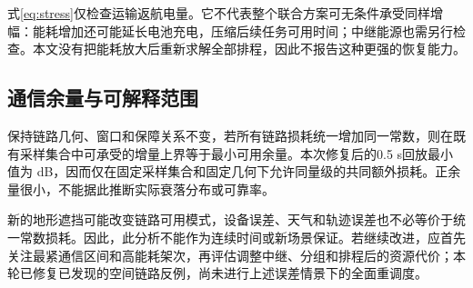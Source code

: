 式\eqref{eq:stress}仅检查运输返航电量。它不代表整个联合方案可无条件承受同样增幅：能耗增加还可能延长电池充电，压缩后续任务可用时间；中继能源也需另行检查。本文没有把能耗放大后重新求解全部排程，因此不报告这种更强的恢复能力。

\subsection{通信余量与可解释范围}
保持链路几何、窗口和保障关系不变，若所有链路损耗统一增加同一常数，则在既有采样集合中可承受的增量上界等于最小可用余量。本次修复后的0.5 s回放最小值为 \MarginHalf{} dB，因而仅在固定采样集合和固定几何下允许同量级的共同额外损耗。正余量很小，不能据此推断实际衰落分布或可靠率。

新的地形遮挡可能改变链路可用模式，设备误差、天气和轨迹误差也不必等价于统一常数损耗。因此，此分析不能作为连续时间或新场景保证。若继续改进，应首先关注最紧通信区间和高能耗架次，再评估调整中继、分组和排程后的资源代价；本轮已修复已发现的空间链路反例，尚未进行上述误差情景下的全面重调度。
\FloatBarrier

